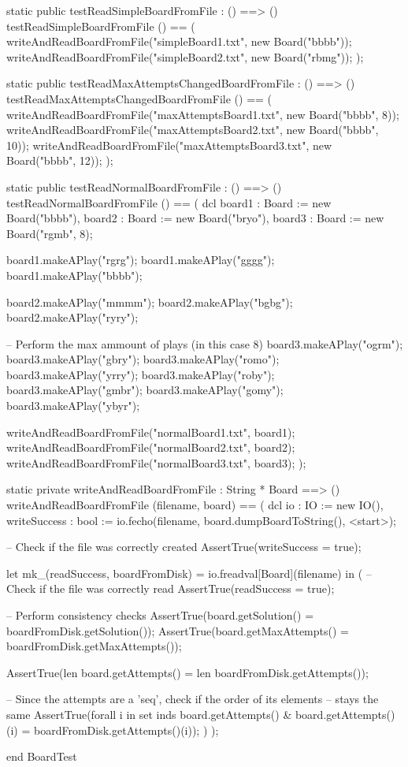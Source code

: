 \begin{vdm_al}
 static public testReadSimpleBoardFromFile : () ==> ()
 testReadSimpleBoardFromFile () == (
  writeAndReadBoardFromFile("simpleBoard1.txt", new Board("bbbb"));
  writeAndReadBoardFromFile("simpleBoard2.txt", new Board("rbmg"));
 );

 static public testReadMaxAttemptsChangedBoardFromFile : () ==> ()
 testReadMaxAttemptsChangedBoardFromFile () == (
  writeAndReadBoardFromFile("maxAttemptsBoard1.txt", new Board("bbbb", 8));
  writeAndReadBoardFromFile("maxAttemptsBoard2.txt", new Board("bbbb", 10));
  writeAndReadBoardFromFile("maxAttemptsBoard3.txt", new Board("bbbb", 12));
 );

 static public testReadNormalBoardFromFile : () ==> ()
 testReadNormalBoardFromFile () == (
  dcl board1 : Board := new Board("bbbb"),
   board2 : Board := new Board("bryo"),
   board3 : Board := new Board("rgmb", 8);

   board1.makeAPlay("rgrg");
   board1.makeAPlay("gggg");
   board1.makeAPlay("bbbb");

   board2.makeAPlay("mmmm");
   board2.makeAPlay("bgbg");
   board2.makeAPlay("ryry");

   -- Perform the max ammount of plays (in this case 8)
   board3.makeAPlay("ogrm");
   board3.makeAPlay("gbry");
   board3.makeAPlay("romo");
   board3.makeAPlay("yrry");
   board3.makeAPlay("roby");
   board3.makeAPlay("gmbr");
   board3.makeAPlay("gomy");
   board3.makeAPlay("ybyr");

   writeAndReadBoardFromFile("normalBoard1.txt", board1);
   writeAndReadBoardFromFile("normalBoard2.txt", board2);
   writeAndReadBoardFromFile("normalBoard3.txt", board3);
  );


 static private writeAndReadBoardFromFile : String * Board ==> ()
 writeAndReadBoardFromFile (filename, board) == (
  dcl io : IO := new IO(),
  writeSuccess : bool := io.fecho(filename, board.dumpBoardToString(), <start>);

  -- Check if the file was correctly created
  AssertTrue(writeSuccess = true);

  let mk_(readSuccess, boardFromDisk) = io.freadval[Board](filename) in (
   -- Check if the file was correctly read
   AssertTrue(readSuccess = true);

   -- Perform consistency checks
   AssertTrue(board.getSolution() = boardFromDisk.getSolution());
   AssertTrue(board.getMaxAttempts() = boardFromDisk.getMaxAttempts());

   AssertTrue(len board.getAttempts() = len boardFromDisk.getAttempts());

   -- Since the attempts are a 'seq', check if the order of its elements
   -- stays the same
   AssertTrue(forall i in set inds board.getAttempts() &
    board.getAttempts()(i) = boardFromDisk.getAttempts()(i));
  )
 );

end BoardTest
\end{vdm_al}
